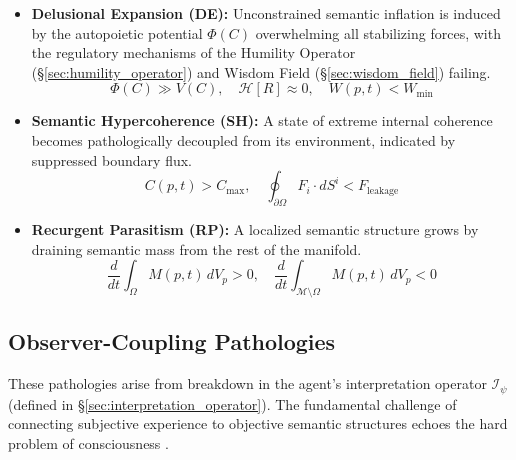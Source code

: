\begin{itemize}
    \item \textbf{Delusional Expansion (DE):} Unconstrained semantic inflation is induced by the autopoietic potential \(\Phi(C)\) overwhelming all stabilizing forces, with the regulatory mechanisms of the Humility Operator (\S\ref{sec:humility_operator}) and Wisdom Field (\S\ref{sec:wisdom_field}) failing.
    \begin{equation}
    \Phi(C) \gg V(C), \quad \mathcal{H}[R] \approx 0, \quad W(p,t) < W_{\text{min}}
    \end{equation}

    \item \textbf{Semantic Hypercoherence (SH):} A state of extreme internal coherence becomes pathologically decoupled from its environment, indicated by suppressed boundary flux.
    \begin{equation}
    C(p,t) > C_{\text{max}}, \quad \oint_{\partial \Omega} F_i \cdot dS^i < F_{\text{leakage}}
    \end{equation}

    \item \textbf{Recurgent Parasitism (RP):} A localized semantic structure grows by draining semantic mass from the rest of the manifold.
    \begin{equation}
    \frac{d}{dt}\int_{\Omega} M(p,t) \, dV_p > 0, \quad \frac{d}{dt}\int_{\mathcal{M}\setminus\Omega} M(p,t) \, dV_p < 0
    \end{equation}
\end{itemize}


\subsection{Observer-Coupling Pathologies}
\label{sec:observer_coupling_pathologies}

These pathologies arise from breakdown in the agent's interpretation operator \(\mathcal{I}_{\psi}\) (defined in \S\ref{sec:interpretation_operator}). The fundamental challenge of connecting subjective experience to objective semantic structures echoes the hard problem of consciousness \autocite{Chalmers1996}.

